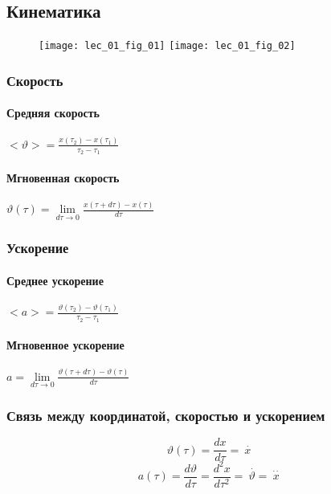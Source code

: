 \documentclass[class=article,a4paper,12pt,crop=false]{standalone}
\begin{document}
  \subsection{Кинематика}
  \vspace*{.2in}
  \begin{figure}[h]
    \centering
    \texttt{[image: lec\_01\_fig\_01]}
    \hspace*{.5in}
    \texttt{[image: lec\_01\_fig\_02]}
  \end{figure}

  \subsubsection{Скорость}

  \paragraph{Средняя скорость} $<\vartheta > = \frac{x(\tau_2) - x(\tau_1)}{\tau_2 - \tau_1}$

  \paragraph{Мгновенная скорость} $\vartheta(\tau) = \lim\limits_{d\tau \rightarrow 0}\frac{x(\tau + d\tau) - x(\tau)}{d\tau}$

  \subsubsection{Ускорение}

  \paragraph{Среднее ускорение} $<a> = \frac{\vartheta(\tau_2) - \vartheta(\tau_1)}{\tau_2 - \tau_1}$

  \paragraph{Мгновенное ускорение} $a = \lim\limits_{d\tau \rightarrow 0}\frac{\vartheta(\tau + d\tau) - \vartheta(\tau)}{d\tau}$

  \subsubsection{Связь между координатой, скоростью и ускорением}

  \begin{equation}
    \vartheta (\tau) = \frac{dx}{d\tau} = \: \stackrel{\cdot }{x}
  \end{equation}
  \begin{equation}
    a(\tau) = \frac{d\vartheta}{d\tau} = \frac{d^2x}{d\tau^2} = \: \stackrel{\cdot}{\vartheta} = \: \stackrel{\cdot\cdot}{x}
  \end{equation}
\end{document}
